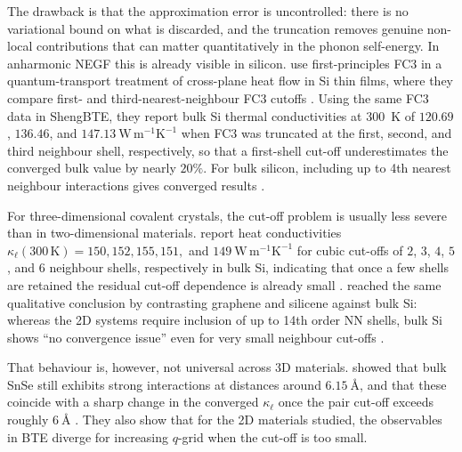 The drawback is that the approximation error is uncontrolled: there is no variational bound
on what is discarded, and the truncation removes genuine non-local contributions that can
matter quantitatively in the phonon self-energy. In anharmonic NEGF this is already visible in
silicon. \citeauthor{guo_quantum_2020} use first-principles FC3 in a quantum-transport treatment
of cross-plane heat flow in Si thin films, where they compare first- and third-nearest-neighbour
FC3 cutoffs \cite{guo_quantum_2020}. Using the same FC3 data in ShengBTE, they report bulk Si
thermal conductivities at 300~K of $120.69$, $136.46$, and $147.13~\mathrm{W\,m^{-1}K^{-1}}$ when
FC3 was truncated at the first, second, and third neighbour shell, respectively, so that a
first-shell cut-off underestimates the converged bulk value by nearly $20\%$. For bulk silicon,
including up to 4th nearest neighbour interactions gives converged results
\cite{li_shengbte_2014, qin_accelerating_2018}.

For three-dimensional covalent crystals, the cut-off problem is usually less severe than in
two-dimensional materials. \citeauthor{mcgaughey_phonon_2019} report heat conductivities
$\kappa_\ell(300\,\mathrm{K}) = 150, 152, 155, 151,$ and $149~\mathrm{W\,m^{-1}K^{-1}}$ for
cubic cut-offs of $2$, $3$, $4$, $5$, and $6$ neighbour shells, respectively in bulk Si, indicating
that once a few shells are retained the residual cut-off dependence is already small
\cite{mcgaughey_phonon_2019}. \citeauthor{jiang_how_2022} reached the same qualitative conclusion
by contrasting graphene and silicene against bulk Si: whereas the 2D systems require inclusion of
up to 14th order NN shells, bulk Si shows ``no convergence issue'' even for very small neighbour
cut-offs \cite{jiang_how_2022}.

That behaviour is, however, not universal across 3D materials. \citeauthor{qin_accelerating_2018}
showed that bulk SnSe still exhibits strong interactions at distances around $6.15~\text{\AA}$,
and that these coincide with a sharp change in the converged $\kappa_\ell$ once the pair cut-off
exceeds roughly $6~\text{\AA}$ \cite{qin_accelerating_2018}. They also show that for the 2D
materials studied, the observables in BTE diverge for increasing $q$-grid when the cut-off is too
small.

